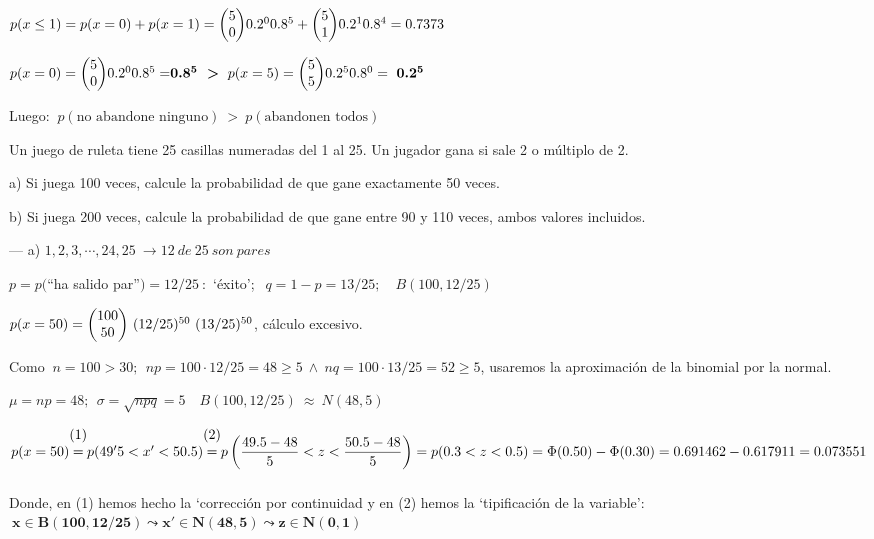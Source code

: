 $p(x\le 1)=p(x=0)+p(x=1)=\mqty(5\\0)0.2^0 0.8^5+\mqty(5\\1)0.2^1 0.8^4=0.7373$

$p(x=0)=\mqty(5\\0)0.2^0 0.8^5 =\boldsymbol{0.8^5 \ > \ }p(x=5)=\mqty(5\\5)0.2^5 0.8^0 = \ \boldsymbol{0.2^5}$

Luego: $\ p(\text{no abandone ninguno}) \ > \ p(\text{abandonen todos})$

\vspace{4mm}
\begin{ejemplo}
\begin{ejer}
	Un juego de ruleta tiene 25 casillas numeradas del 1 al 25. Un jugador gana si sale 2 o múltiplo de 2.

a)  Si juega 100 veces, calcule la probabilidad de que gane exactamente 50 veces. 

b) Si juega 200 veces, calcule la probabilidad de que gane entre 90 y 110 veces, ambos valores incluidos.

\end{ejer}
\end{ejemplo}

--- a) $1,2,3,\cdots ,24,25 \ \to  12 \ de \  25 \ son \ pares$

$p= p($``ha salido par''$)=12/25 \ :$ `éxito'; $\ \ q=1-p=13/25;\quad B(100,12/25)$

$p(x=50)=\mqty(100\\50) \ (12/25)^{50} \ (13/25)^{50}$, cálculo excesivo.

Como $\ n=100>30;\ \ np=100\cdot 12/25=48\ge 5 \ \wedge \ nq=100\cdot 13/25=52\ge 5$, usaremos la aproximación de la binomial por la normal.

$\mu=np=48;\ \ \sigma=\sqrt{npq}=5 \quad B(100,12/25) \ \approx \ N(48,5)$

$p(x=50) \mqty{(1)\\= \\  \textcolor{white}{.}} p(49'5<x'<50.5) 
\mqty{(2)\\= \\  \textcolor{white}{.}}
p\left( \dfrac{49.5-48}{5} < z < \dfrac{50.5-48}{5} \right) = 
p(0.3<z<0.5)=\Phi(0.50)-\Phi(0.30)=0.691462-0.617911=0.073551$

Donde, en (1)  hemos hecho la `corrección por continuidad y en (2) hemos la `tipificación de la variable':  $\ \boldsymbol{ x\in  B(100,12/25) \leadsto x'\in N(48,5) \leadsto z\in N(0,1)}$

